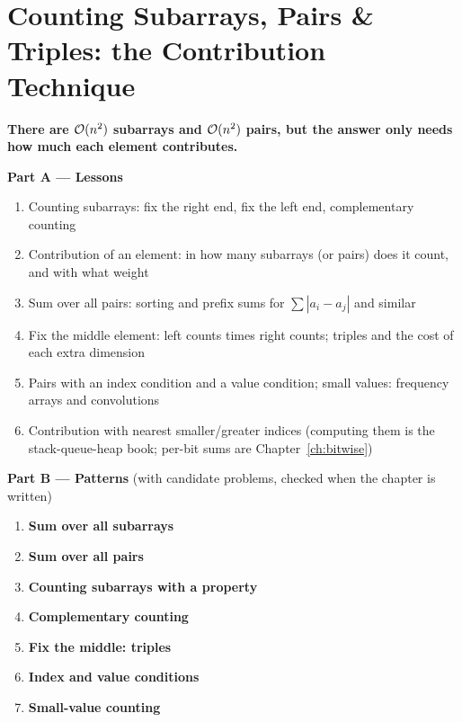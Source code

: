 \chapter{Counting Subarrays, Pairs \& Triples: the Contribution Technique}
\label{ch:contribution}

\begin{tcolorbox}[enhanced, colback=white, colframe=secondaryblue, boxrule=1pt, arc=2mm]
\textbf{\large\textcolor{primaryblue}{There are $\mathcal{O}(n^2)$ subarrays and $\mathcal{O}(n^2)$ pairs, but the answer only needs how much each element contributes.}}
\end{tcolorbox}


\begin{plannedbox}
\textbf{Part A --- Lessons}
\begin{enumerate}[leftmargin=*, label=\textbf{A\arabic*.}, itemsep=1pt]
    \item Counting subarrays: fix the right end, fix the left end, complementary counting
    \item Contribution of an element: in how many subarrays (or pairs) does it count, and with what weight
    \item Sum over all pairs: sorting and prefix sums for $\sum |a_i - a_j|$ and similar
    \item Fix the middle element: left counts times right counts; triples and the cost of each extra dimension
    \item Pairs with an index condition and a value condition; small values: frequency arrays and convolutions
    \item Contribution with nearest smaller/greater indices (computing them is the stack-queue-heap book; per-bit sums are Chapter~\ref{ch:bitwise})
\end{enumerate}
\textbf{Part B --- Patterns} (with candidate problems, checked when the chapter is written)
\begin{enumerate}[leftmargin=*, label=\textbf{P\arabic*.}, itemsep=1pt]
    \item \textbf{Sum over all subarrays}
    \item \textbf{Sum over all pairs}
    \item \textbf{Counting subarrays with a property}
    \item \textbf{Complementary counting}
    \item \textbf{Fix the middle: triples}
    \item \textbf{Index and value conditions}
    \item \textbf{Small-value counting}
\end{enumerate}
\end{plannedbox}
